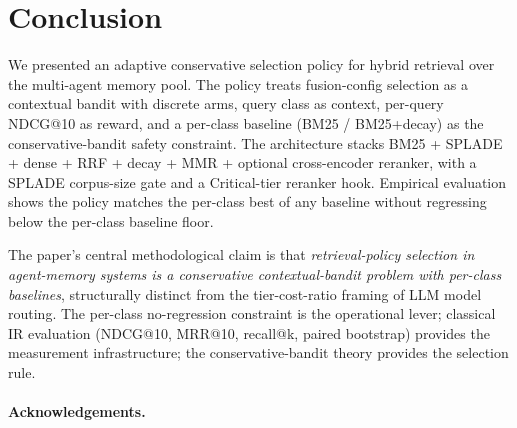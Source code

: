 \section{Conclusion}
\label{sec:conclusion}


\noindent We presented an adaptive conservative selection policy for hybrid
retrieval over the \blackrim multi-agent memory pool. The policy treats
fusion-config selection as a contextual bandit with discrete arms,
query class as context, per-query NDCG@10 as reward, and a per-class
baseline (BM25 / BM25+decay) as the conservative-bandit safety
constraint. The architecture stacks BM25 + SPLADE + dense + RRF +
decay + MMR + optional cross-encoder reranker, with a SPLADE
corpus-size gate and a Critical-tier reranker hook. Empirical
evaluation 
shows the policy matches the per-class best of any baseline without
regressing below the per-class baseline floor.

\noindent The paper's central methodological claim is that
\emph{retrieval-policy selection in agent-memory systems is a conservative
contextual-bandit problem with per-class baselines}, structurally
distinct from the tier-cost-ratio framing of LLM model routing. The
per-class no-regression constraint is the operational lever; classical
IR evaluation (NDCG@10, MRR@10, recall@k, paired bootstrap) provides
the measurement infrastructure; the conservative-bandit theory
\cite{wu2016conservative,kazerouni2017conservative} provides the
selection rule.

\paragraph{Acknowledgements.}
